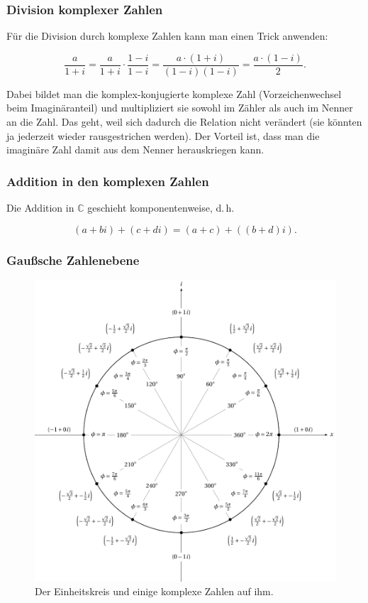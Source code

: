\documentclass{scrartcl}
\begin{document}
\subsubsection{Division komplexer Zahlen}

Für die Division durch komplexe Zahlen kann man einen Trick anwenden:

\begin{equation}
	\frac{a}{1 + i} = \frac{a}{1 + i} \cdot \frac{1 - i}{1 - i} =
	\frac{a \cdot (1 + i)}{(1 - i)(1 - i)} = 
	\frac{a \cdot (1 - i)}{2}.
\end{equation}

Dabei bildet man die komplex-konjugierte komplexe Zahl (Vorzeichenwechsel beim Imaginäranteil) und multipliziert sie sowohl im
Zähler als auch im Nenner an die Zahl. Das geht, weil sich dadurch die Relation nicht verändert (sie könnten ja jederzeit
wieder rausgestrichen werden). Der Vorteil ist, dass man die imaginäre Zahl damit aus dem 
Nenner herauskriegen kann.

\subsubsection{Addition in den komplexen Zahlen}

Die Addition in $\mathbb{C}$ geschieht komponentenweise, d.\,h.

\begin{equation}
	(a + bi) + (c + di) = (a+c) + ((b+d)i).
\end{equation}

\subsubsection{Gaußsche Zahlenebene}

\begin{figure}[h!]
	\includegraphics[width=\textwidth]{unit.pdf}
	\caption{Der Einheitskreis und einige komplexe Zahlen auf ihm.}
\end{figure}
\end{document}
